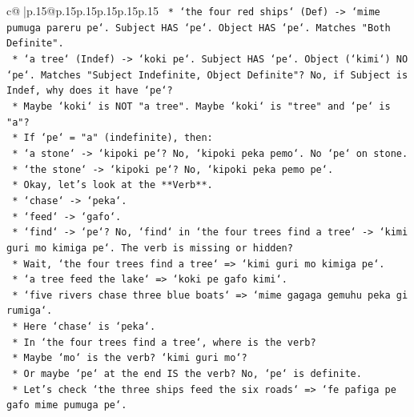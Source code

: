 \documentclass{article}
\begin{document}
{\begin{supertabular}{c@{$\;$}|p{.15\linewidth}@{}p{.15\linewidth}p{.15\linewidth}p{.15\linewidth}p{.15\linewidth}p{.15\linewidth}}
{{{\texttt{                        *   `the four red ships` (Def) {-}> `mime pumuga pareru pe`. Subject HAS `pe`. Object HAS `pe`. Matches "Both Definite".} \\
\texttt{                        *   `a tree` (Indef) {-}> `koki pe`. Subject HAS `pe`. Object (`kimi`) NO `pe`. Matches "Subject Indefinite, Object Definite"? No, if Subject is Indef, why does it have `pe`?} \\
\texttt{                        *   Maybe `koki` is NOT "a tree". Maybe `koki` is "tree" and `pe` is "a"?} \\
\texttt{                        *   If `pe` = "a" (indefinite), then:} \\
\texttt{                            *   `a stone` {-}> `kipoki pe`? No, `kipoki peka pemo`. No `pe` on stone.} \\
\texttt{                            *   `the stone` {-}> `kipoki pe`? No, `kipoki peka pemo pe`.} \\
\texttt{                        *   Okay, let's look at the **Verb**.} \\
\texttt{                            *   `chase` {-}> `peka`.} \\
\texttt{                            *   `feed` {-}> `gafo`.} \\
\texttt{                            *   `find` {-}> `pe`? No, `find` in `the four trees find a tree` {-}> `kimi guri mo kimiga pe`. The verb is missing or hidden?} \\
\texttt{                            *   Wait, `the four trees find a tree` => `kimi guri mo kimiga pe`.} \\
\texttt{                            *   `a tree feed the lake` => `koki pe gafo kimi`.} \\
\texttt{                            *   `five rivers chase three blue boats` => `mime gagaga gemuhu peka gi rumiga`.} \\
\texttt{                            *   Here `chase` is `peka`.} \\
\texttt{                            *   In `the four trees find a tree`, where is the verb?} \\
\texttt{                            *   Maybe `mo` is the verb? `kimi guri mo`?} \\
\texttt{                            *   Or maybe `pe` at the end IS the verb? No, `pe` is definite.} \\
\texttt{                            *   Let's check `the three ships feed the six roads` => `fe pafiga pe gafo mime pumuga pe`.} \\
}}}
\end{supertabular}}
\end{document}
